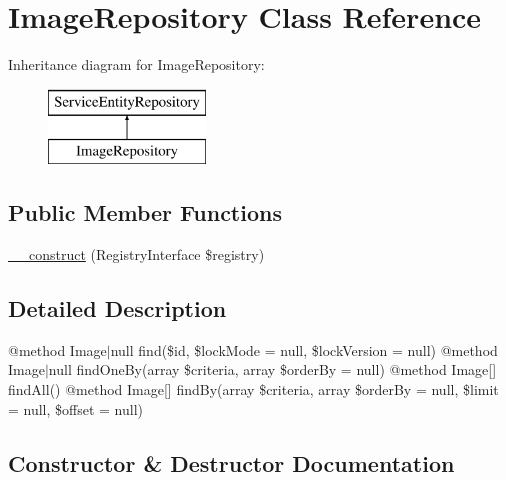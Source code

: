 \hypertarget{class_app_1_1_repository_1_1_image_repository}{}\section{Image\+Repository Class Reference}
\label{class_app_1_1_repository_1_1_image_repository}
Inheritance diagram for Image\+Repository\+:\begin{figure}[H]
\begin{center}
\leavevmode
\includegraphics[height=2.000000cm]{class_app_1_1_repository_1_1_image_repository}
\end{center}
\end{figure}
\subsection*{Public Member Functions}
\begin{DoxyCompactItemize}
\item 
\mbox{\hyperlink{class_app_1_1_repository_1_1_image_repository_aadca7edd263e228921a1860bb6b9c252}{\+\_\+\+\_\+construct}} (Registry\+Interface \$registry)
\end{DoxyCompactItemize}


\subsection{Detailed Description}
@method Image$\vert$null find(\$id, \$lock\+Mode = null, \$lock\+Version = null) @method Image$\vert$null find\+One\+By(array \$criteria, array \$order\+By = null) @method Image\mbox{[}\mbox{]} find\+All() @method Image\mbox{[}\mbox{]} find\+By(array \$criteria, array \$order\+By = null, \$limit = null, \$offset = null) 

\subsection{Constructor \& Destructor Documentation}
\mbox{\label{class_app_1_1_repository_1_1_image_repository_aadca7edd263e228921a1860bb6b9c252}} 
